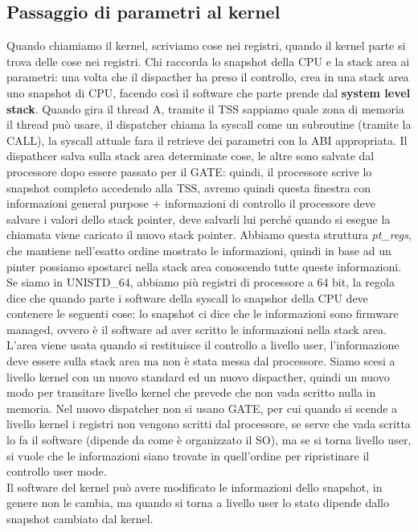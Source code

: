 \documentclass[12pt, oneside]{extbook}
\begin{document}
\subsection{Passaggio di parametri al kernel}
Quando chiamiamo il kernel, scriviamo cose nei registri, quando il kernel parte si trova delle cose nei registri. Chi raccorda lo snapshot della CPU e la stack area ai parametri: una volta che il dispacther ha preso il controllo, crea in una stack area uno snapshot di CPU, facendo così il software che parte prende dal \textbf{system level stack}. Quando gira il thread A, tramite il TSS sappiamo quale zona di memoria il thread può usare, il dispatcher chiama la syscall come un subroutine (tramite la CALL), la syscall attuale fara il retrieve dei parametri con la ABI appropriata. Il dispathcer salva sulla stack area determinate cose, le altre sono salvate dal processore dopo essere passato per il GATE: quindi, il processore scrive lo snapshot completo accedendo alla TSS, avremo quindi questa finestra con informazioni general purpose + informazioni di controllo
il processore deve salvare i valori dello stack pointer, deve salvarli lui perché quando si esegue la chiamata viene caricato il nuovo stack pointer. Abbiamo questa struttura \textit{pt\_regs}, che mantiene nell'esatto ordine mostrato le informazioni, quindi in base ad un pinter possiamo spostarci nella stack area conoscendo tutte queste informazioni. Se siamo in UNISTD\_64, abbiamo più registri di processore a 64 bit, la regola dice che quando parte i software della syscall lo snapshor della CPU deve contenere le seguenti cose:
lo snapshot ci dice che le informazioni sono firmware managed, ovvero è il software ad aver scritto le informazioni nella stack area. L'area viene usata quando si restituisce il controllo a livello user, l'informazione deve essere sulla stack area ma non è stata messa dal processore. Siamo scesi a livello kernel con un nuovo standard ed un nuovo dispacther, quindi un nuovo modo per transitare livello kernel che prevede che non vada scritto nulla in memoria. Nel nuovo dispatcher non si usano GATE, per cui quando si scende a livello kernel i registri non vengono scritti dal processore, se serve che vada scritta lo fa il software (dipende da come è organizzato il SO), ma se si torna livello user, si vuole che le informazioni siano trovate in quell'ordine per ripristinare il controllo user mode.\\ Il software del kernel può avere modificato le informazioni dello snapshot, in genere non le cambia, ma quando si torna a livello user lo stato dipende dallo snapshot cambiato dal kernel.
\end{document}

